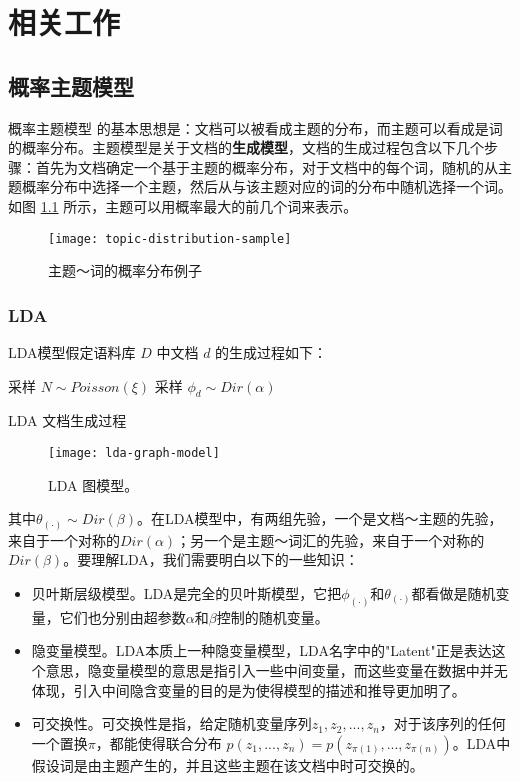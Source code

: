 \chapter{相关工作}

\section{概率主题模型}
概率主题模型 \cite{griffiths2004finding, Blei:2003, hofmann1999probabilistic, hofmann2001unsupervised} 的基本思想是：文档可以被看成主题的分布，而主题可以看成是词的概率分布。主题模型是关于文档的\textbf{生成模型}，文档的生成过程包含以下几个步骤：首先为文档确定一个基于主题的概率分布，对于文档中的每个词，随机的从主题概率分布中选择一个主题，然后从与该主题对应的词的分布中随机选择一个词。如图 \ref{fig:topic-distribution-sample} 所示，主题可以用概率最大的前几个词来表示。
\begin{figure}[htb]
    \centering%
    \texttt{[image: topic-distribution-sample]}
    \caption{主题～词的概率分布例子}
    \label{fig:topic-distribution-sample}
\end{figure}

\subsection{LDA}
\label{intro-lda}
LDA\cite{Blei:2003}模型假定语料库 $D$ 中文档 $d$ 的生成过程如下：\\
\begin{algorithm}[!htb]
  采样 $N \sim Poisson(\xi)$\;
  采样 $\phi_d \sim Dir(\alpha)$\;
  \caption{LDA 文档生成过程}
  \label{lda-generative-process}
\end{algorithm}
\begin{figure}[htb]
    \centering%
    \texttt{[image: lda-graph-model]}
    \caption{LDA 图模型。}
    \label{fig:lda-graph-model}
\end{figure}
其中$\theta_{(\cdot)} \sim Dir(\beta)$。在LDA模型中，有两组先验，一个是文档～主题的先验，来自于一个对称的$Dir(\alpha)$；另一个是主题～词汇的先验，来自于一个对称的$Dir(\beta)$。要理解LDA，我们需要明白以下的一些知识：
\begin{itemize}
\item 贝叶斯层级模型。LDA是完全的贝叶斯模型，它把$\phi_{(\cdot)}$和$\theta_{(\cdot)}$都看做是随机变量，它们也分别由超参数$\alpha$和$\beta$控制的随机变量。
\item 隐变量模型。LDA本质上一种隐变量模型，LDA名字中的"Latent"正是表达这个意思，隐变量模型的意思是指引入一些中间变量，而这些变量在数据中并无体现，引入中间隐含变量的目的是为使得模型的描述和推导更加明了。
\item 可交换性。可交换性是指，给定随机变量序列${z_1, z_2, ... , z_n}$，对于该序列的任何一个置换$\pi$，都能使得联合分布 $p(z_1, ..., z_n)=p(z_{\pi(1)}, ..., z_{\pi(n)})$。LDA中假设词是由主题产生的，并且这些主题在该文档中时可交换的。
\end{itemize}

